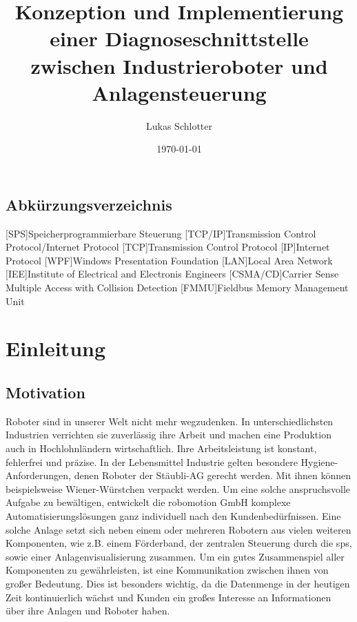 \documentclass[ a4paper,
                oneside,
                toc=bibliography,
                toc=listof
                ]{scrbook}
\author{Lukas Schlotter}
\title{Konzeption und Implementierung einer Diagnoseschnittstelle zwischen Industrieroboter und Anlagensteuerung}
\date{\today}
\begin{document}
 
    \frontmatter
    \makeISWtitle
    
    \cleardoublepage
	\setcounter{page}{1} %

    
    \cleardoublepage
    \tableofcontents
    
  
    \section*{Abkürzungsverzeichnis}
    \begin{acronym}[TCP/IP]
    	[SPS]{Speicherprogrammierbare Steuerung}
    	[TCP/IP]{Transmission Control Protocol/Internet Protocol}
    	[TCP]{Transmission Control Protocol}
    	[IP]{Internet Protocol}
    	[WPF]{Windows Presentation Foundation}
    	[LAN]{Local Area Network}
    	[IEE]{Institute of Electrical and Electronis Engineers}
    	[CSMA/CD]{Carrier Sense Multiple Access with Collision Detection}
    	[FMMU]{Fieldbus Memory Management Unit}
    	
    \end{acronym}

    \mainmatter
    
    \chapter{Einleitung}

    \section{Motivation}
    Roboter sind in unserer Welt nicht mehr wegzudenken. In unterschiedlichsten Industrien verrichten sie zuverlässig ihre Arbeit und machen eine Produktion auch in Hochlohnländern wirtschaftlich. Ihre Arbeitsleistung ist konstant, fehlerfrei und präzise. In der Lebensmittel Industrie gelten besondere Hygiene-Anforderungen, denen Roboter der \glqq Stäubli-AG\grqq{} gerecht werden. Mit ihnen können beispielsweise Wiener-Würstchen verpackt werden. Um eine solche anspruchsvolle Aufgabe zu bewältigen, entwickelt die \glqq robomotion GmbH\grqq{} komplexe Automatisierungslösungen ganz individuell nach den Kundenbedürfnissen. Eine solche Anlage setzt sich neben einem oder mehreren Robotern aus vielen weiteren Komponenten, wie z.B. einem Förderband, der zentralen Steuerung durch die \ac{sps}, sowie einer Anlagenvisualisierung zusammen. Um ein gutes Zusammenspiel aller Komponenten zu gewährleisten, ist eine Kommunikation zwischen ihnen von großer Bedeutung. Dies ist besonders wichtig, da die Datenmenge in der heutigen Zeit kontinuierlich wächst und Kunden ein großes Interesse an Informationen über ihre Anlagen und Roboter haben.
\end{document}
